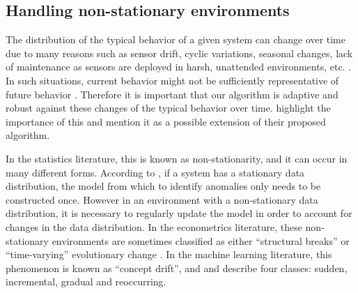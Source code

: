 \documentclass[12pt]{article}
\begin{document}
\hypertarget{handling-non-stationary-environments}{%
\subsection{Handling non-stationary
environments}\label{handling-non-stationary-environments}}

\label{sec:handlingconceptdrift}

The distribution of the typical behavior of a given system can change
over time due to many reasons such as sensor drift, cyclic variations,
seasonal changes, lack of maintenance as sensors are deployed in harsh,
unattended environments, etc.
\citep{moshtaghi2014streaming, o2014anomaly}. In such situations,
current behavior might not be sufficiently representative of future
behavior \citep{chandola2009anomaly}. Therefore it is important that our
algorithm is adaptive and robust against these changes of the typical
behavior over time. \citet{cuppens2014accelerometry} highlight the
importance of this and mention it as a possible extension of their
proposed algorithm.

In the statistics literature, this is known as non-stationarity, and it
can occur in many different forms. According to \citet{o2014anomaly}, if
a system has a stationary data distribution, the model from which to
identify anomalies only needs to be constructed once. However in an
environment with a non-stationary data distribution, it is necessary to
regularly update the model in order to account for changes in the data
distribution. In the econometrics literature, these non-stationary
environments are sometimes classified as either ``structural breaks'' or
``time-varying'' evolutionary change \citep{rapach2008structural}. In
the machine learning literature, this phenomenon is known as ``concept
drift'', and \citet{gama2014survey} and \citet{faria2016novelty}
describe four classes: sudden, incremental, gradual and reoccurring.
\end{document}
